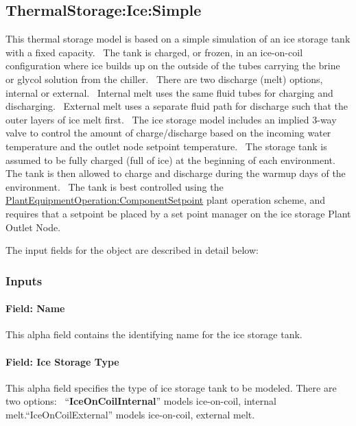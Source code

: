 \subsection{ThermalStorage:Ice:Simple}\label{thermalstorageicesimple}

This thermal storage model is based on a simple simulation of an ice storage tank with a fixed capacity.~ The tank is charged, or frozen, in an ice-on-coil configuration where ice builds up on the outside of the tubes carrying the brine or glycol solution from the chiller.~ There are two discharge (melt) options, internal or external.~ Internal melt uses the same fluid tubes for charging and discharging.~ External melt uses a separate fluid path for discharge such that the outer layers of ice melt first.~ The ice storage model includes an implied 3-way valve to control the amount of charge/discharge based on the incoming water temperature and the outlet node setpoint temperature.~ The storage tank is assumed to be fully charged (full of ice) at the beginning of each environment.~ The tank is then allowed to charge and discharge during the warmup days of the environment.~ The tank is best controlled using the \hyperref[plantequipmentoperationcomponentsetpoint]{PlantEquipmentOperation:ComponentSetpoint} plant operation scheme, and requires that a setpoint be placed by a set point manager on the ice storage Plant Outlet Node.

The input fields for the object are described in detail below:

\subsubsection{Inputs}\label{inputs-20-004}

\paragraph{Field: Name}\label{field-name-20-001}

This alpha field contains the identifying name for the ice storage tank.

\paragraph{Field: Ice Storage Type}\label{field-ice-storage-type}

This alpha field specifies the type of ice storage tank to be modeled. There are two options:~ ``\textbf{IceOnCoilInternal}'' models ice-on-coil, internal melt.``IceOnCoilExternal'' models ice-on-coil, external melt.

